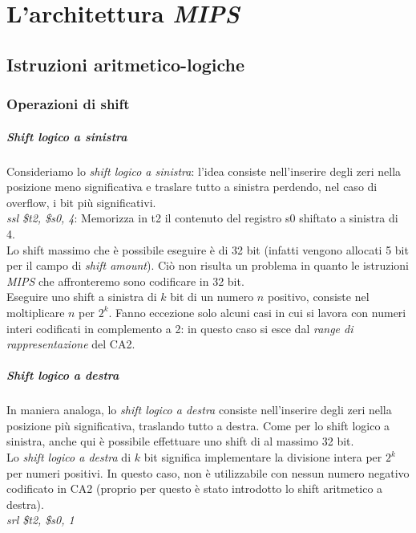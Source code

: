 \documentclass[class=book, crop=false]{standalone}
\begin{document}
\chapter{L'architettura \emph{MIPS}}

\section{Istruzioni aritmetico-logiche}
\subsection{Operazioni di shift}
\paragraph{Shift logico a sinistra}
Consideriamo lo \emph{shift logico a sinistra}: l'idea consiste nell'inserire degli zeri nella posizione meno significativa e traslare tutto a sinistra perdendo, nel caso di overflow, i bit più significativi.\\
\emph{ssl \$t2, \$s0, 4}: Memorizza in t2 il contenuto del registro s0 shiftato a sinistra di 4.\\
Lo shift massimo che è possibile eseguire è di 32 bit (infatti vengono allocati 5 bit per il campo di \emph{shift amount}). Ciò non risulta un problema in quanto le istruzioni \emph{MIPS} che affronteremo sono codificare in 32 bit.\\
Eseguire uno shift a sinistra di \(k\) bit di un numero \(n\) positivo, consiste nel moltiplicare \(n\) per \(2^k\). Fanno eccezione solo alcuni casi in cui si lavora con numeri interi codificati in complemento a 2: in questo caso si esce dal \emph{range di rappresentazione} del CA2.

\paragraph{Shift logico a destra}
In maniera analoga, lo \emph{shift logico a destra} consiste nell'inserire degli zeri nella posizione più significativa, traslando tutto a destra. Come per lo shift logico a sinistra, anche qui è possibile effettuare uno shift di al massimo 32 bit.\\
Lo \emph{shift logico a destra} di \(k\) bit significa implementare la divisione intera per \(2^k\) per numeri positivi. In questo caso, non è utilizzabile con nessun numero negativo codificato in CA2 (proprio per questo è stato introdotto lo shift aritmetico a destra).\\
\emph{srl \$t2, \$s0, 1}
\end{document}
